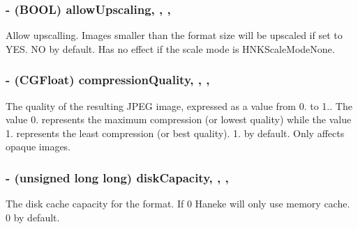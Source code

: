 \subsubsection[{allow\+Upscaling}]{\setlength{\rightskip}{0pt plus 5cm}-\/ (B\+O\+O\+L) allow\+Upscaling\hspace{0.3cm}{\ttfamily [read]}, {\ttfamily [write]}, {\ttfamily [nonatomic]}, {\ttfamily [assign]}}\label{interface_h_n_k_cache_format_aab518aa4d3e96125bb27fd8f9eba8434}
Allow upscalling. Images smaller than the format size will be upscaled if set to Y\+E\+S. N\+O by default.  Has no effect if the scale mode is H\+N\+K\+Scale\+Mode\+None. \hypertarget{interface_h_n_k_cache_format_a3edfe8ac876f90afe1164ecae20cac21}{}
\subsubsection[{compression\+Quality}]{\setlength{\rightskip}{0pt plus 5cm}-\/ (C\+G\+Float) compression\+Quality\hspace{0.3cm}{\ttfamily [read]}, {\ttfamily [write]}, {\ttfamily [nonatomic]}, {\ttfamily [assign]}}\label{interface_h_n_k_cache_format_a3edfe8ac876f90afe1164ecae20cac21}
The quality of the resulting J\+P\+E\+G image, expressed as a value from 0. to 1.. The value 0. represents the maximum compression (or lowest quality) while the value 1. represents the least compression (or best quality). 1. by default.  Only affects opaque images. \hypertarget{interface_h_n_k_cache_format_ab7b9cd33c5cc626688d92511651b8d81}{}
\subsubsection[{disk\+Capacity}]{\setlength{\rightskip}{0pt plus 5cm}-\/ (unsigned long long) disk\+Capacity\hspace{0.3cm}{\ttfamily [read]}, {\ttfamily [write]}, {\ttfamily [nonatomic]}, {\ttfamily [assign]}}\label{interface_h_n_k_cache_format_ab7b9cd33c5cc626688d92511651b8d81}
The disk cache capacity for the format. If 0 Haneke will only use memory cache. 0 by default. \hypertarget{interface_h_n_k_cache_format_aeeea00feba542e026e941c74ec94e432}{}
